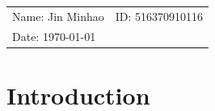 \documentclass{article}
\begin{document}
\vspace*{0.25cm}
\hrulefill
\thispagestyle{empty}

\begin{center}
\begin{large}
\end{large}

\hrulefill

\vspace*{5cm}
\begin{Large}
\end{Large}

\vspace{2em}

\begin{large}
\end{large}
\end{center}


\vfill

\begin{table}[h!]
\flushleft
\begin{tabular}{ll}
Name: Jin Minhao \hspace*{2em}&
ID: 516370910116\hspace*{2em}\\





Date: \today

\end{tabular}
\end{table}


\newpage
\section{Introduction}
\end{document}
